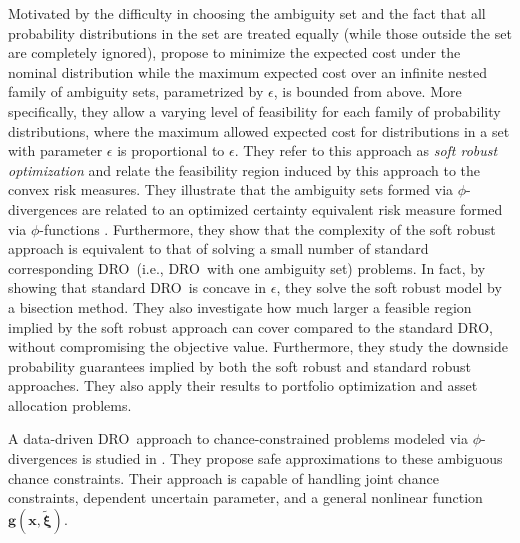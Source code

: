 \documentclass[final,onefignum,onetabnum]{class}
\newcommand{\bs}[1]{\boldsymbol{#1}} %
\newcommand{\txi}{\tilde{\bs{\xi}}}
\newcommand{\dro}{DRO}
\begin{document}
Motivated by the difficulty in choosing the ambiguity set and the fact that all probability distributions in the set are treated equally (while those outside the set are completely ignored),  \citet{ben2010soft} propose to minimize the expected cost under the nominal distribution while the maximum expected cost over an infinite nested family of ambiguity sets, parametrized by $\epsilon$, is bounded from above. 
More specifically, they allow a varying level of feasibility for each family of probability distributions, where the maximum allowed expected cost for distributions in a set with parameter $\epsilon$ is proportional to $\epsilon$. They refer to this approach as {\it soft robust optimization} and relate the feasibility region induced by this approach to the convex risk measures. They illustrate that the ambiguity sets formed via $\phi$-divergences are related to an optimized certainty equivalent risk measure formed via $\phi$-functions \citep{bental2007OCE}. Furthermore, they show that the complexity of the soft robust approach is equivalent to that of solving a small
number of standard corresponding  \dro\ (i.e., \dro\ with one ambiguity set)  problems. In fact, by showing that standard \dro\ is concave in $\epsilon$, they solve the soft robust model by a bisection method. They also investigate how much larger a feasible region implied by the soft robust approach can cover compared to the standard \dro, without compromising the objective value. Furthermore, they study the downside probability guarantees implied by both the soft robust and standard robust approaches. They also apply their results to portfolio optimization and asset allocation problems.


A data-driven \dro\ approach to  chance-constrained problems modeled via $\phi$-divergences is studied in \citet{yanikoglu2012}. They  propose safe approximations to these ambiguous chance constraints. Their approach is capable of handling joint chance constraints, dependent uncertain parameter, and a general nonlinear function  $\bs{g}(\bs{x},\txi)$. 
\end{document}
